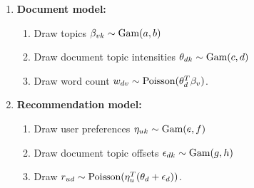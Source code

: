 \begin{enumerate}
  \item \textbf{Document model:}
  \begin{enumerate}
  \item Draw topics $\beta_{vk} \sim \textrm{Gam}(a, b)$
  \item Draw document topic intensities $\theta_{dk} \sim \textrm{Gam}(c, d)$
  \item Draw word count $w_{dv} \sim \textrm{Poisson}(\theta_d^T \beta_v)$.
  \end{enumerate}
  \item \textbf{Recommendation model:}
  \begin{enumerate}
  \item Draw user preferences $\eta_{uk} \sim \textrm{Gam}(e, f)$
  \item Draw document topic offsets $\epsilon_{dk} \sim \textrm{Gam}(g, h)$
  \item Draw $r_{ud} \sim \textrm{Poisson}(\eta_u^T (\theta_d + \epsilon_d))$.
  \end{enumerate}
\end{enumerate}